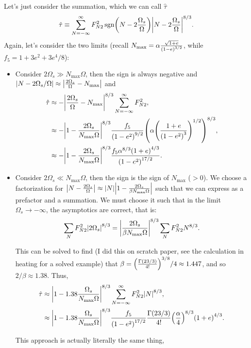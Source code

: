 \documentclass[11pt,
        usenames, %
        dvipsnames %
    ]{article}
\DeclareMathOperator{\sgn}{sgn}
\DeclarePairedDelimiter\abs{\lvert}{\rvert}
\DeclarePairedDelimiter\p{\lparen}{\rparen}
\begin{document}
Let's just consider the summation, which we can call $\hat{\tau}$
\begin{equation}
    \hat{\tau} \equiv \sum\limits_{N = -\infty}^\infty
        F_{N2}^2 \sgn\p*{N - 2\frac{\Omega_s}{\Omega}}
            \abs*{N - 2\frac{\Omega_s}{\Omega}}^{8/3}.
\end{equation}
Again, let's consider the two limits (recall $N_{\max} = \alpha \frac{\sqrt{1 +
e}}{\p*{1 - e}^{3/2}}$, while $f_5 = 1 + 3e^2 + 3e^4/8$):
\begin{itemize}
    \item Consider $2\Omega_s \gg N_{\max}\Omega$, then the sign is always
        negative and $\abs*{N - 2\Omega_s/\Omega} \approx
        \abs*{\frac{2\Omega_s}{\Omega} - N_{\max}}$ and
        \begin{align}
            \hat{\tau}
                &\approx -\abs*{\frac{2\Omega_s}{\Omega} - N_{\max}}^{8/3}
                    \sum\limits_{N = -\infty}^\infty F_{N2}^2,\\
                &\approx -\abs*{1 - \frac{2\Omega_s}{N_{\max}\Omega}}^{8/3}
                    \frac{f_5}{\p*{1 - e^2}^{9/2}}\p*{\alpha\p*{\frac{1 + e}{\p*{1 -
                    e^2}^3}}^{1/2}}^{8/3},\\
                &\approx -\abs*{1 - \frac{2\Omega_s}{N_{\max}\Omega}}^{8/3}
                    \frac{f_5\alpha^{8/3}\p*{1 + e}^{4/3}}{\p*{1 - e^2}^{17/2}}.
        \end{align}

    \item Consider $2\Omega_s \ll N_{\max} \Omega$, then the sign is the
        sign of $N_{\max}$ ($>0$). We choose a factorization for $\abs*{N -
        \frac{2\Omega_s}{\Omega}} \approx \abs*{N}\abs*{1 -
        \frac{2\Omega_s}{\beta N_{\max}\Omega}}$ such that we can express as a
        prefactor and a summation. We must choose it such that in the limit
        $\Omega_s \to -\infty$, the asymptotics are correct, that is:
        \begin{equation}
            \sum\limits_{N} F_{N2}^2 \abs*{2\Omega_s}^{8/3}
                = \abs*{\frac{2\Omega_s}{\beta N_{\max}\Omega}}^{8/3}
                    \sum\limits_{N}F_{N2}^2 N^{8/3}.
        \end{equation}

        This can be solved to find (I did this on scratch paper, see the
        calculation in heating for a solved example) that $\beta =
        \p*{\frac{\Gamma\p*{23/3}}{4!}}^{3/8}/4 \approx 1.447$, and so $2/\beta
        \approx 1.38$. Thus,
        \begin{align}
            \hat{\tau}
                &\approx \abs*{1 - 1.38\frac{\Omega_s}{N_{\max}\Omega}}^{8/3}
                    \sum\limits_{N = -\infty}^\infty F_{N2}^2 \abs*{N}^{8/3},\\
                &\approx \abs*{1 - 1.38\frac{\Omega_s}{N_{\max}\Omega}}^{8/3}
                    \frac{f_5}{\p*{1 - e^2}^{17/2}}
                    \frac{\Gamma(23/3)}{4!}\p*{\frac{\alpha}{4}}^{8/3}
                        \p*{1 + e}^{4/3}.
        \end{align}

        This approach is actually literally the same thing,
\end{itemize}
\end{document}
